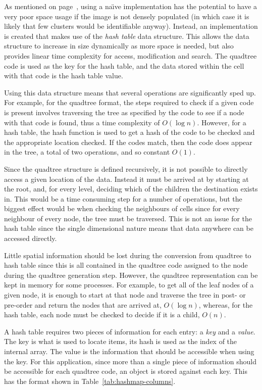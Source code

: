 As mentioned on page~\pageref{prt:custom_algorithm}, using a na\"{\i}ve
implementation has the potential to have a very poor space usage if the image
is not densely populated (in which case it is likely that few clusters would be
identifiable anyway). Instead, an implementation is created that makes use of
the \emph{hash table} data structure\cite{cormen2001introduction}. This allows
the data structure to increase in size dynamically as more space is needed, but
also provides linear time complexity for access, modification and search. The
quadtree code is used as the key for the hash table, and the data stored within
the cell with that code is the hash table value.

Using this data structure means that several operations are significantly sped
up. For example, for the quadtree format, the steps required to check if a
given code is present involves traversing the tree as specified by the code to see if a node with that code is found, thus a time
complexity of $O(\log n)$.  However, for a hash table, the hash function is
used to get a hash of the code to be checked and the appropriate location
checked. If the codes match, then the code does appear in the tree, a total of
two operations, and so constant $O(1)$.

Since the quadtree structure is defined recursively, it is not possible to
directly access a given location of the data. Instead it must be arrived at by
starting at the root, and, for every level, deciding which of the children the
destination exists in. This would be a time consuming step for a number of
operations, but the biggest effect would be when checking the neighbours of
cells since for every neighbour of every node, the tree must be traversed. This
is not an issue for the hash table since the single dimensional nature means
that data anywhere can be accessed directly.

Little spatial information should be lost during the conversion from quadtree
to hash table since this is all contained in the quadtree code assigned to the
node during the quadtree generation step. However, the quadtree representation
can be kept in memory for some processes. For example, to get all of the leaf
nodes of a given node, it is enough to start at that node and traverse the tree
in post- or pre-order and return the nodes that are arrived at, $O(\log n)$,
whereas, for the hash table, each node must be checked to decide if it is a
child, $O(n)$.

A hash table requires two pieces of information for each entry: a \emph{key}
and a \emph{value}. The key is what is used to locate items, its hash is used
as the index of the internal array. The value is the information that should be
accessible when using the key. For this application, since more than a single
piece of information should be accessible for each quadtree code, an object is
stored against each key. This has the format shown in
Table~\ref{tab:hashmap-columns}.

